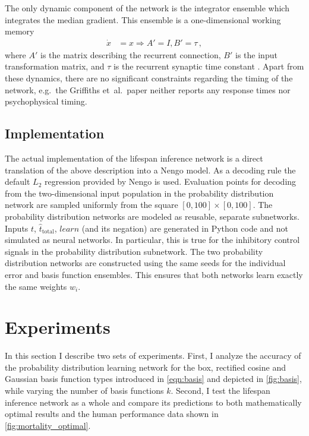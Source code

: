 \documentclass[a4paper,11pt]{article}
\begin{document}
The only dynamic component of the network is the integrator ensemble which integrates the median gradient. This ensemble is a one-dimensional working memory
\begin{align}
	\dot x &= x \Rightarrow A' = I, B' = \tau \,,
\end{align}
where $A'$ is the matrix describing the recurrent connection, $B'$ is the input transformation matrix, and $\tau$ is the recurrent synaptic time constant \cite{eliasmith2003neural}. Apart from these dynamics, there are no significant constraints regarding the timing of the network, e.g.~the Griffiths et~al.~paper neither reports any response times nor psychophysical timing.

\subsection{Implementation}

The actual implementation of the lifespan inference network is a direct translation of the above description into a Nengo \cite{bekolay2014nengo} model. As a decoding rule the default $L_2$ regression provided by Nengo is used. Evaluation points for decoding from the two-dimensional input population in the probability distribution network are sampled uniformly from the square $[0, 100] \times [0, 100]$. The probability distribution networks are modeled as reusable, separate subnetworks. Inputs $t$, $\hat t_\mathrm{total}$, $\mathit{learn}$ (and its negation) are generated in Python code and not simulated as neural networks. In particular, this is true for the inhibitory control signals in the probability distribution subnetwork. The two probability distribution networks are constructed using the same seeds for the individual error and basis function ensembles. This ensures that both networks learn exactly the same weights $w_i$.

\pagebreak
\section{Experiments}
\label{sec:experiments}

In this section I describe two sets of experiments. First, I analyze the accuracy of the probability distribution learning network for the box, rectified cosine and Gaussian basis function types introduced in \cref{eqn:basis} and depicted in \cref{fig:basis}, while varying the number of basis functions $k$. Second, I test the lifespan inference network as a whole and compare its predictions to both mathematically optimal results and the human performance data shown in \cref{fig:mortality_optimal}.
\end{document}
